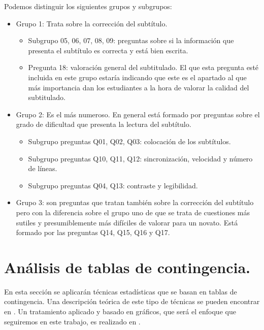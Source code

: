 \documentclass[
  12pt,
  a4paper,
  extrafontsizes,
  onecolumn,
  openright]{memoir}
\providecommand{\tightlist}{%
  \setlength{\itemsep}{0pt}\setlength{\parskip}{0pt}}\usepackage{longtable,booktabs,array}
\begin{document}
Podemos distinguir los siguientes grupos y subgrupos:

\begin{itemize}
\tightlist
\item
  Grupo 1: Trata sobre la corrección del subtítulo.

  \begin{itemize}
  \tightlist
  \item
    Subgrupo 05, 06, 07, 08, 09: preguntas sobre si la información que
    presenta el subtítulo es correcta y está bien escrita.
  \item
    Pregunta 18: valoración general del subtitulado. El que esta
    pregunta esté incluida en este grupo estaría indicando que este es
    el apartado al que más importancia dan los estudiantes a la hora de
    valorar la calidad del subtitulado.
  \end{itemize}
\item
  Grupo 2: Es el más numeroso. En general está formado por preguntas
  sobre el grado de dificultad que presenta la lectura del subtítulo.

  \begin{itemize}
  \tightlist
  \item
    Subgrupo preguntas Q01, Q02, Q03: colocación de los subtítulos.
  \item
    Subgrupo preguntas Q10, Q11, Q12: sincronización, velocidad y número
    de líneas.
  \item
    Subgrupo preguntas Q04, Q13: contraste y legibilidad.
  \end{itemize}
\item
  Grupo 3: son preguntas que tratan también sobre la corrección del
  subtítulo pero con la diferencia sobre el grupo uno de que se trata de
  cuestiones más sutiles y presumiblemente más difíciles de valorar para
  un novato. Está formado por las preguntas Q14, Q15, Q16 y Q17.
\end{itemize}

\hypertarget{anuxe1lisis-de-tablas-de-contingencia.}{%
\section{Análisis de tablas de
contingencia.}\label{anuxe1lisis-de-tablas-de-contingencia.}}

En esta sección se aplicarán técnicas estadísticas que se basan en
tablas de contingencia. Una descripción teórica de este tipo de técnicas
se pueden encontrar en \textcite{agresti_2018}. Un tratamiento aplicado
y basado en gráficos, que será el enfoque que seguiremos en este
trabajo, es realizado en \textcite{frienly2015}.
\end{document}
